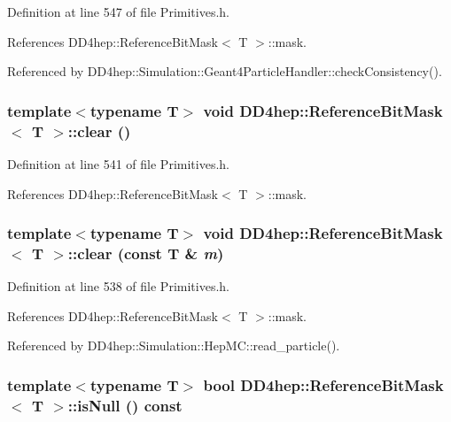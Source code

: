 Definition at line 547 of file Primitives.h.

References DD4hep::ReferenceBitMask$<$ T $>$::mask.

Referenced by DD4hep::Simulation::Geant4ParticleHandler::checkConsistency().\hypertarget{class_d_d4hep_1_1_reference_bit_mask_a22b33d5d302fa4e84c10689f07886517}{
\subsubsection[{clear}]{\setlength{\rightskip}{0pt plus 5cm}template$<$typename T$>$ void {\bf DD4hep::ReferenceBitMask}$<$ T $>$::clear ()}}
\label{class_d_d4hep_1_1_reference_bit_mask_a22b33d5d302fa4e84c10689f07886517}


Definition at line 541 of file Primitives.h.

References DD4hep::ReferenceBitMask$<$ T $>$::mask.\hypertarget{class_d_d4hep_1_1_reference_bit_mask_a3c384d81d710f444161e1f8cbf9420ae}{
\subsubsection[{clear}]{\setlength{\rightskip}{0pt plus 5cm}template$<$typename T$>$ void {\bf DD4hep::ReferenceBitMask}$<$ T $>$::clear (const T \& {\em m})}}
\label{class_d_d4hep_1_1_reference_bit_mask_a3c384d81d710f444161e1f8cbf9420ae}


Definition at line 538 of file Primitives.h.

References DD4hep::ReferenceBitMask$<$ T $>$::mask.

Referenced by DD4hep::Simulation::HepMC::read\_\-particle().\hypertarget{class_d_d4hep_1_1_reference_bit_mask_a9e7daae6ed22c928db375380fe7f9f93}{
\subsubsection[{isNull}]{\setlength{\rightskip}{0pt plus 5cm}template$<$typename T$>$ bool {\bf DD4hep::ReferenceBitMask}$<$ T $>$::isNull () const}}
\label{class_d_d4hep_1_1_reference_bit_mask_a9e7daae6ed22c928db375380fe7f9f93}



